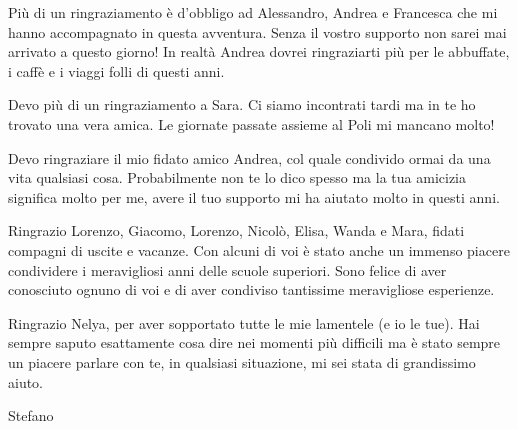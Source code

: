 Più di un ringraziamento è d’obbligo ad Alessandro, Andrea e Francesca che mi hanno accompagnato in questa avventura. Senza il vostro supporto non sarei mai arrivato a questo giorno! In realtà Andrea dovrei ringraziarti più per le abbuffate, i caffè e i viaggi folli di questi anni.

Devo più di un ringraziamento a Sara. Ci siamo incontrati tardi ma in te ho trovato una vera amica. Le giornate passate assieme al Poli mi mancano molto!

Devo ringraziare il mio fidato amico Andrea, col quale condivido ormai da una vita qualsiasi cosa. Probabilmente non te lo dico spesso ma la tua amicizia significa molto per me, avere il tuo supporto mi ha aiutato molto in questi anni.

Ringrazio Lorenzo, Giacomo, Lorenzo, Nicolò, Elisa, Wanda e Mara, fidati compagni di uscite e vacanze. Con alcuni di voi è stato anche un immenso piacere condividere i meravigliosi anni delle scuole superiori. Sono felice di aver conosciuto ognuno di voi e di aver condiviso tantissime meravigliose esperienze.

Ringrazio Nelya, per aver sopportato tutte le mie lamentele (e io le tue). Hai sempre saputo esattamente cosa dire nei momenti più difficili ma è stato sempre un piacere parlare con te, in qualsiasi situazione, mi sei stata di grandissimo aiuto.

\vspace{1cm}

\begin{flushright}
	Stefano
\end{flushright}